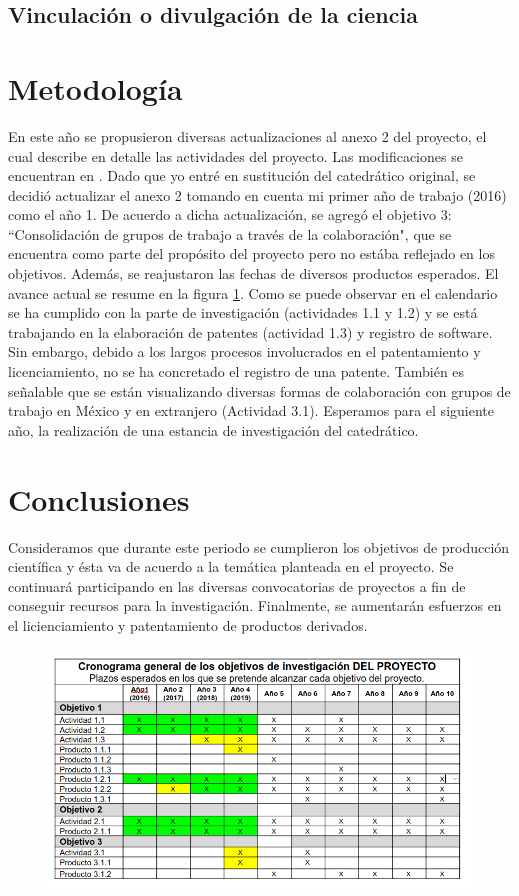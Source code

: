 \documentclass[]{article}
\begin{document}
\subsection{Vinculación o divulgación de la ciencia}




\section{Metodología}

En este año se propusieron diversas actualizaciones al anexo 2 del proyecto, el cual describe en detalle las actividades del proyecto. Las modificaciones se encuentran en \cite{anexo2actualizado}. Dado que yo entré en sustitución del catedrático original, se decidió actualizar el anexo 2 tomando en cuenta mi primer año de trabajo (2016) como el año 1. De acuerdo a dicha actualización, se agregó el objetivo 3: ``Consolidación de grupos de trabajo a través de la colaboración", que se encuentra como parte del propósito del proyecto pero no estába reflejado en los objetivos. Además, se reajustaron las fechas de diversos productos esperados. El avance actual se resume en la figura \ref{fig:avances}. Como se puede observar en el calendario se ha cumplido con la parte de investigación (actividades 1.1 y 1.2) y se está trabajando en la elaboración de patentes (actividad 1.3) y registro de software. Sin embargo, debido a los largos procesos involucrados en el patentamiento y licenciamiento, no se ha concretado el registro de una patente. También es señalable que se están visualizando diversas formas de colaboración con grupos de trabajo en México y en extranjero (Actividad 3.1). Esperamos para el siguiente año, la realización de una estancia de investigación del catedrático. 


\section{Conclusiones}

Consideramos que durante este periodo se cumplieron los objetivos de producción científica y ésta va de acuerdo a la temática planteada en el proyecto. Se continuará participando en las diversas convocatorias de proyectos a fin de conseguir recursos para la investigación. Finalmente, se aumentarán esfuerzos en el licienciamiento y patentamiento de productos derivados.


\begin{figure}
	\centering
	\includegraphics[width=\linewidth]{avances}
	\caption{}
	\label{fig:avances}
\end{figure}




	
\end{document}
